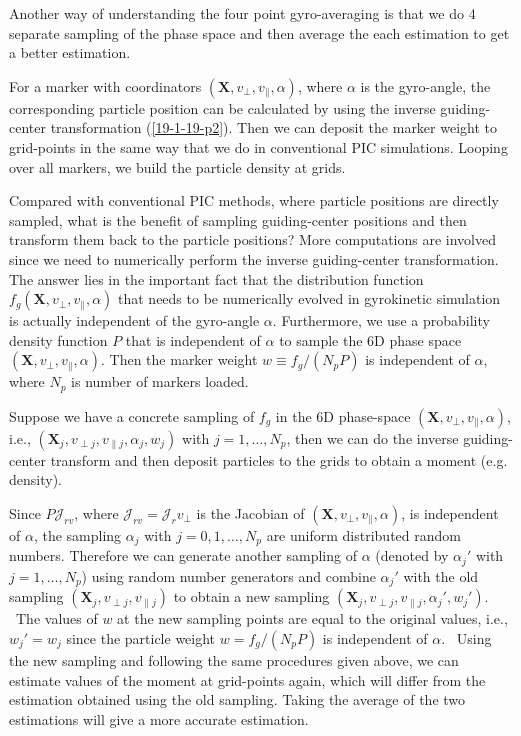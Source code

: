 \documentclass{llncs}
\begin{document}
Another way of understanding the four point gyro-averaging is that we do 4
separate sampling of the phase space and then average the each estimation to
get a better estimation.

For a marker with coordinators $(\mathbf{X}, v_{\perp}, v_{\parallel},
\alpha)$, where $\alpha$ is the gyro-angle, the corresponding particle
position can be calculated by using the inverse guiding-center transformation
(\ref{19-1-19-p2}). Then we can deposit the marker weight to grid-points in
the same way that we do in conventional PIC simulations. Looping over all
markers, we build the particle density at grids.

Compared with conventional PIC methods, where particle positions are directly
sampled, what is the benefit of sampling guiding-center positions and then
transform them back to the particle positions? More computations are involved
since we need to numerically perform the inverse guiding-center
transformation. The answer lies in the important fact that the distribution
function $f_g (\mathbf{X}, v_{\perp}, v_{\parallel}, \alpha)$ that needs to be
numerically evolved in gyrokinetic simulation is actually independent of the
gyro-angle $\alpha$. Furthermore, we use a probability density function $P$
that is independent of $\alpha$ to sample the 6D phase space $(\mathbf{X},
v_{\perp}, v_{\parallel}, \alpha)$. Then the marker weight $w \equiv f_g /
(N_p P)$ is independent of $\alpha$, where $N_p$ is number of markers loaded.

Suppose we have a concrete sampling of $f_g$ in the 6D phase-space
$(\mathbf{X}, v_{\perp}, v_{\parallel}, \alpha)$, i.e., $(\mathbf{X}_j,
v_{\perp j}, v_{\parallel j}, \alpha_j, w_j)$ with $j = 1, \ldots, N_p$, then
we can do the inverse guiding-center transform and then deposit particles to
the grids to obtain a moment (e.g. density).

Since $P \mathcal{J}_{r v}$, where $\mathcal{J}_{r v} = \mathcal{J}_r
v_{\perp}$ is the Jacobian of $(\mathbf{X}, v_{\perp}, v_{\parallel},
\alpha)$, is independent of $\alpha$, the sampling $\alpha_j$ with $j = 0, 1,
\ldots, N_p$ are uniform distributed random numbers. Therefore we can generate
another sampling of $\alpha$ (denoted by $\alpha_j'$ with $j = 1, \ldots,
N_p$) using random number generators and combine $\alpha_j'$ with the old
sampling $(\mathbf{X}_j, v_{\perp j}, v_{\parallel j})$ to obtain a new
sampling $(\mathbf{X}_j, v_{\perp j}, v_{\parallel j}, \alpha_j', w_j')$. \
The values of $w$ at the new sampling points are equal to the original values,
i.e., $w_j' = w_j$ since the particle weight $w = f_g / (N_p P)$ is
independent of $\alpha$. \ Using the new sampling and following the same
procedures given above, we can estimate values of the moment at grid-points
again, which will differ from the estimation obtained using the old sampling.
Taking the average of the two estimations will give a more accurate
estimation.
\end{document}
